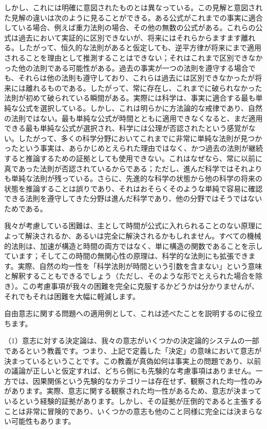 \documentclass[a4paper,11pt,openany]{ltjsbook}
\begin{document}
しかし、これには明確に意図されたものとは異なっている。この見解と意図された見解の違いは次のように見ることができる。ある公式がこれまでの事実に適合している場合、例えば重力法則の場合、その他の無数の公式がある。これらの公式は過去において実証的に区別できないが、将来にはそれらからますます離れる。したがって、恒久的な法則があると仮定しても、逆平方律が将来にまで適用されることを理由として推測することはできない；それはこれまで区別できなかった他の法則である可能性がある。過去の事実が一つの法則を遵守する場合でも、それらは他の法則も遵守しており、これらは過去には区別できなかったが将来には離れるものである。したがって、常に存在し、これまでに破られなかった法則が初めて破られている瞬間がある。実際には科学は、事実に適合する最も単純な公式を選択している。しかし、これは明らかに方法論的な戒律であり、自然の法則ではない。最も単純な公式が時間とともに適用できなくなると、まだ適用できる最も単純な公式が選択され、科学には公理が否認されたという感覚がない。したがって、多くの科学分野においてこれまでに非常に単純な法則が見つかったという事実は、あらかじめとえられた理由ではなく、かつ過去の法則が継続すると推論するための証拠としても使用できない。これはなぜなら、常に以前に真であった法則が否認されているからである；ただし、進んだ科学ではそれよりも単純な法則が残っている。さらに、先進的な科学の状態から他の科学の将来の状態を推論することは誤りであり、それはおそらくそのような単純で容易に確認できる法則を遵守してきた分野は進んだ科学であり、他の分野ではそうではないためである。


我々が考慮している困難は、主として時間が公式に入れられることのない原理によって解決されるか、あるいは完全に解決されるかもしれません。すべての機械的法則は、加速が構造と時間の両方ではなく、単に構造の関数であることを示しています；そしてこの時間の無関心性の原理は、科学的な法則にも拡張できます。実際、自然の均一性を「科学法則が時間という引数を含まない」という意味と解釈することもできるでしょう（ただし、そのような形でとえられた場合を除き）。この考慮事項が我々の困難を完全に克服するかどうかは分かりませんが、それでもそれは困難を大幅に軽減します。

自由意志に関する問題への適用例として、これは述べたことを説明するのに役立ちます。

（1）意志に対する決定論は、我々の意志がいくつかの決定論的システムの一部であるという教義です。つまり、上記で定義した「決定」の意味において意志が決まっているということです。この教義が真偽如何は事実上の問題であり、以前の議論が正しいと仮定すれば、どちら側にも先験的な考慮事項はありません。一方では、因果関係という先験的なカテゴリーは存在せず、観察された均一性のみがあります。実際、意志に関する観察された均一性があるため、意志が決まっているという経験的証拠があります。しかし、その証拠が圧倒的であると主張することは非常に冒険的であり、いくつかの意志も他のこと同様に完全には決まらない可能性もあります。
\end{document}
